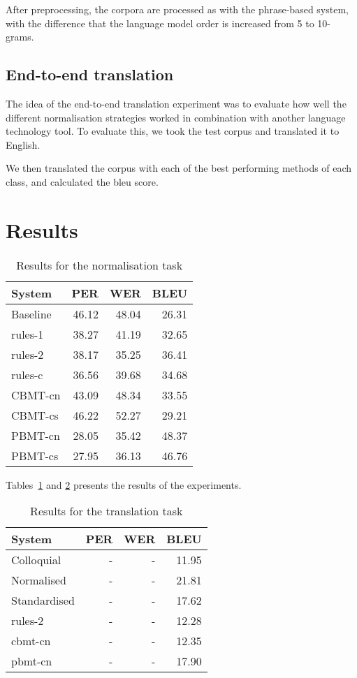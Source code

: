 \documentclass[11pt]{article}
\begin{document}
After preprocessing, the corpora are processed as with the phrase-based system, with the difference that the language model order is increased from 5 to 10-grams.

\subsection{End-to-end translation}

The idea of the end-to-end translation experiment was to evaluate how well the different 
normalisation strategies worked in combination with another language technology tool. To
evaluate this, we took the test corpus and translated it to English. 

We then translated the corpus with each of the best performing methods of each class, and 
calculated the {\sc bleu} score.

\section{Results}

\begin{table}
  \centering
  \begin{tabular}{|l|r|r|r|}
     \hline
    \textbf{System} & \textbf{PER} & \textbf{WER} & \textbf{BLEU} \\
     \hline
     Baseline & 46.12 & 48.04 & 26.31 \\
     \hline
     rules-1 & 38.27 & 41.19 & 32.65 \\
     rules-2 & 38.17 & 35.25 & 36.41 \\
     rules-c & 36.56 & 39.68 & 34.68 \\
     \hline
     CBMT-cn & 43.09 & 48.34 & 33.55 \\
     CBMT-cs & 46.22 & 52.27 & 29.21 \\
     PBMT-cn & 28.05 & 35.42 & 48.37 \\
     PBMT-cs & 27.95 & 36.13 & 46.76 \\
     \hline
  \end{tabular}
  \caption{Results for the normalisation task}
  \label{table:results-norm}
\end{table}

Tables~\ref{table:results-norm} and \ref{table:results-trad} presents the results of the experiments.

\begin{table}
  \centering
  \begin{tabular}{|l|r|r|r|}
     \hline
    \textbf{System} & \textbf{PER} & \textbf{WER} & \textbf{BLEU} \\
     \hline
     Colloquial & - & - & 11.95 \\
     Normalised & - & - & 21.81 \\
     Standardised & - & - & 17.62 \\
     \hline
     rules-2 & - & - & 12.28 \\
     cbmt-cn & - & - & 12.35 \\
     pbmt-cn & - & - & 17.90 \\
     \hline
  \end{tabular}
  \caption{Results for the translation task}
  \label{table:results-trad}
\end{table}
\end{document}
